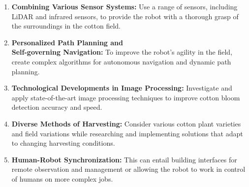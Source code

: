 \documentclass[12pt,a4paper]{report}
\begin{document}
\begin{enumerate}

   \item {\bf{Combining Various Sensor Systems:}}
Use a range of sensors, including LiDAR and infrared sensors, to provide the robot with a thorough grasp of the surroundings in the cotton field.
   \item {\bf{Personalized Path Planning and \\ Self-governing Navigation:}}
To improve the robot's agility in the field, create complex algorithms for autonomous navigation and dynamic path planning.
   \item {\bf{Technological Developments in Image Processing:}}
Investigate and apply state-of-the-art image processing techniques to improve cotton bloom detection accuracy and speed.
   \item {\bf{Diverse Methods of Harvesting:}}
Consider various cotton plant varieties and field variations while researching and implementing solutions that adapt to changing harvesting conditions.
   \item {\bf{Human-Robot Synchronization:}}
This can entail building interfaces for remote observation and management or allowing the robot to work in control of humans on more complex jobs. 

\end{enumerate}





 



%
\appendix
\end{document}
